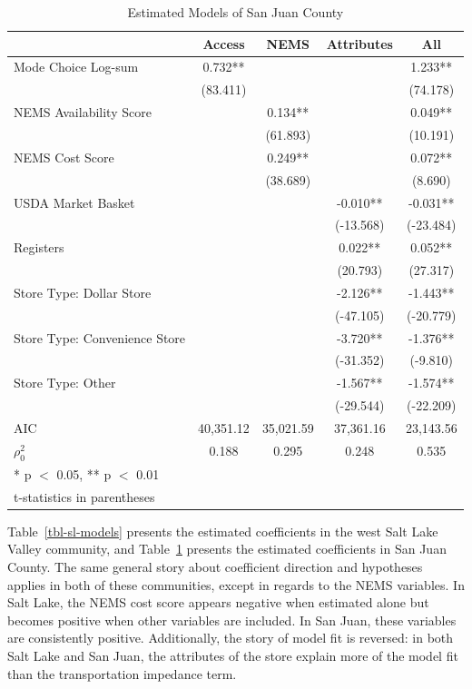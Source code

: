 \documentclass[
  letterpaper,
  DIV=11,
  numbers=noendperiod]{scrreport}
\begin{document}
\hypertarget{tbl-sj-models}{}
\begin{table}
\caption{\label{tbl-sj-models}Estimated Models of San Juan County }\tabularnewline

\centering
\begin{tabular}[t]{lcccc}
\toprule
  & Access & NEMS & Attributes & All\\
\midrule
Mode Choice Log-sum & 0.732** &  &  & 1.233**\\
 & (83.411) &  &  & (74.178)\\
NEMS Availability Score &  & 0.134** &  & 0.049**\\
 &  & (61.893) &  & (10.191)\\
NEMS Cost Score &  & 0.249** &  & 0.072**\\
 &  & (38.689) &  & (8.690)\\
USDA Market Basket &  &  & -0.010** & -0.031**\\
 &  &  & (-13.568) & (-23.484)\\
Registers &  &  & 0.022** & 0.052**\\
 &  &  & (20.793) & (27.317)\\
Store Type: Dollar Store &  &  & -2.126** & -1.443**\\
 &  &  & (-47.105) & (-20.779)\\
Store Type: Convenience Store &  &  & -3.720** & -1.376**\\
 &  &  & (-31.352) & (-9.810)\\
Store Type: Other &  &  & -1.567** & -1.574**\\
 &  &  & (-29.544) & (-22.209)\\
\midrule
AIC & 40,351.12 & 35,021.59 & 37,361.16 & 23,143.56\\
$\rho^2_0$ & 0.188 & 0.295 & 0.248 & 0.535\\
\bottomrule
\multicolumn{5}{l}{\rule{0pt}{1em}* p $<$ 0.05, ** p $<$ 0.01}\\
\multicolumn{5}{l}{\rule{0pt}{1em}t-statistics in parentheses}\\
\end{tabular}
\end{table}

Table~\ref{tbl-sl-models} presents the estimated coefficients in the
west Salt Lake Valley community, and Table~\ref{tbl-sj-models} presents
the estimated coefficients in San Juan County. The same general story
about coefficient direction and hypotheses applies in both of these
communities, except in regards to the NEMS variables. In Salt Lake, the
NEMS cost score appears negative when estimated alone but becomes
positive when other variables are included. In San Juan, these variables
are consistently positive. Additionally, the story of model fit is
reversed: in both Salt Lake and San Juan, the attributes of the store
explain more of the model fit than the transportation impedance term.
\end{document}
